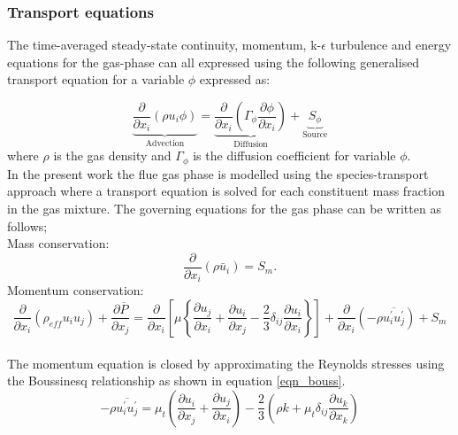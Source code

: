 \documentclass{webofc}
\begin{document}
\subsubsection{Transport equations}
The time-averaged steady-state continuity, momentum, k-$\epsilon$ turbulence  and energy equations for the gas-phase can all expressed using the following generalised transport equation for a variable $\phi$ expressed as:

\begin{equation}\label{eqn_general}
\underbrace{\frac{\partial}{\partial x_{i}}(\rho u_{i}\phi)}_{\text{Advection}}= \underbrace{\frac{\partial}{\partial x_{i}}(\Gamma_{\phi}\frac{\partial \phi}{\partial x_{i}})}_{\text{Diffusion}}+\underbrace{S_{\phi}}_{\text{Source}} 
\end{equation}
where $\rho$ is the gas density and $\Gamma_{\phi}$ is the diffusion coefficient for variable $\phi$.\\

In the present work the flue gas phase is modelled using the species-transport approach where a transport equation is solved for each constituent mass fraction in the gas mixture. The governing equations for the gas phase can be written as follows;\\

Mass conservation:
\begin{equation}\label{eqn_RANS_mass}
\frac{\partial}{\partial x_{i}}(\rho \bar{u}_{i})=S_{m}.
\end{equation}
Momentum conservation:
\\
\begin{equation}\label{eqn_momentum}
\frac{\partial}{\partial x_{i}}(\rho_{eff} u_{i}u_{j})+\frac{\partial \overline{P}}{\partial x_{j}}=\frac{\partial}{\partial x_{i}}\left[\mu\left\{\frac{\partial u_{j}}{\partial x_{i}}+\frac{\partial u_{i}}{\partial x_{j}}-\frac{2}{3}\delta_{ij}\frac{\partial u_{i}}{\partial x_{i}}\right\}\right]+\frac{\partial}{\partial x_{i}}(-\rho\overline{u_{i}^{'}u_{j}^{'}})+S_m
\end{equation}\\

The momentum equation is closed by approximating the Reynolds stresses using the Boussinesq relationship as shown in equation \eqref{eqn_bouss}.
\begin{equation}\label{eqn_bouss}
-\rho\overline{u_{i}^{'}u_{j}^{'}}=\mu_{t}\left(\frac{\partial u_{i}}{\partial x_{j}}+\frac{\partial u_{j}}{\partial x_{i}}\right)-\frac{2}{3}\left(\rho k+\mu_{t}\delta_{ij}\frac{\partial u_{k}}{\partial x_{k}}\right)
\end{equation}
\end{document}
